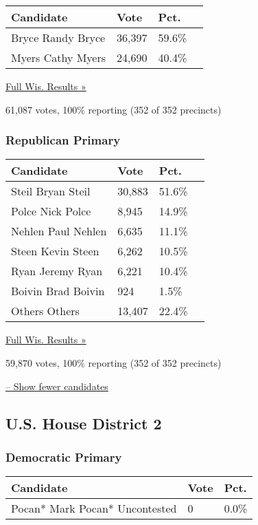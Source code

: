 \begin{longtable}[]{@{}llll@{}}
\toprule
Candidate & Vote & Pct. &\tabularnewline
\midrule
\endhead
 Bryce Randy Bryce & 36,397 & 59.6\% &\tabularnewline
 Myers Cathy Myers & 24,690 & 40.4\% &\tabularnewline
\bottomrule
\end{longtable}

\href{https://www.nytimes3xbfgragh.onion/elections/results/wisconsin}{Full
Wis. Results »}

61,087 votes, 100\% reporting (352 of 352 precincts)

\hypertarget{republican-primary-2}{%
\subsubsection{Republican Primary}\label{republican-primary-2}}

\begin{longtable}[]{@{}llll@{}}
\toprule
Candidate & Vote & Pct. &\tabularnewline
\midrule
\endhead
 Steil Bryan Steil & 30,883 & 51.6\% &\tabularnewline
 Polce Nick Polce & 8,945 & 14.9\% &\tabularnewline
 Nehlen Paul Nehlen & 6,635 & 11.1\% &\tabularnewline
 Steen Kevin Steen & 6,262 & 10.5\% &\tabularnewline
 Ryan Jeremy Ryan & 6,221 & 10.4\% &\tabularnewline
 Boivin Brad Boivin & 924 & 1.5\% &\tabularnewline
 Others Others & 13,407 & 22.4\% &\tabularnewline
\bottomrule
\end{longtable}

\href{https://www.nytimes3xbfgragh.onion/elections/results/wisconsin}{Full
Wis. Results »}

59,870 votes, 100\% reporting (352 of 352 precincts)

\protect\hyperlink{}{-- Show fewer candidates}

\hypertarget{us-house-district-2}{%
\subsection{U.S. House District 2}\label{us-house-district-2}}

\hypertarget{democratic-primary-3}{%
\subsubsection{Democratic Primary}\label{democratic-primary-3}}

\begin{longtable}[]{@{}lll@{}}
\toprule
Candidate & Vote & Pct.\tabularnewline
\midrule
\endhead
 Pocan* Mark Pocan* Uncontested & 0 & 0.0\%\tabularnewline
\bottomrule
\end{longtable}

